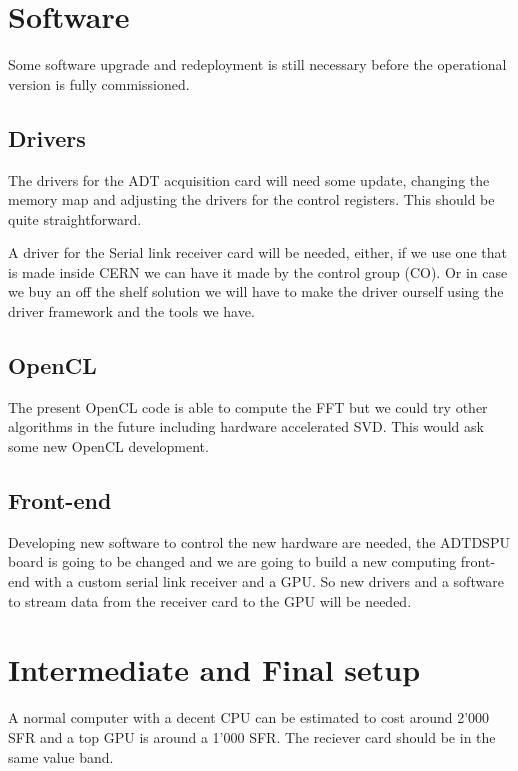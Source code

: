 \section{Software}

Some software upgrade and redeployment is still necessary before the operational version is fully commissioned.

\subsection{Drivers}

The drivers for the \gls{ADT} acquisition card will need some update, changing the memory map and adjusting the drivers for the control registers. This should be quite straightforward.

A driver for the Serial link receiver card will be needed, either, if we use one that is made inside \gls{CERN} we can have it made by the control group (CO). Or in case we buy an off the shelf solution we will have to make the driver ourself using the driver framework and the tools we have.

\subsection{OpenCL}

The present \gls{OpenCL} code is able to compute the \gls{FFT} but we could try other algorithms in the future including hardware accelerated \gls{SVD}. This would ask some new \gls{OpenCL} development.

\subsection{Front-end}

Developing new software to control the new hardware are needed, the ADTDSPU board is going to be changed and we are going to build a new computing front-end with a custom serial link receiver and a \gls{GPU}. So new drivers and a software to stream data from the receiver card to the \gls{GPU} will be needed.

\section{Intermediate and Final setup}

A normal computer with a decent \gls{CPU} can be estimated to cost around 2'000 SFR and a top \gls{GPU} is around a 1'000 SFR. The reciever card should be in the same value band.

